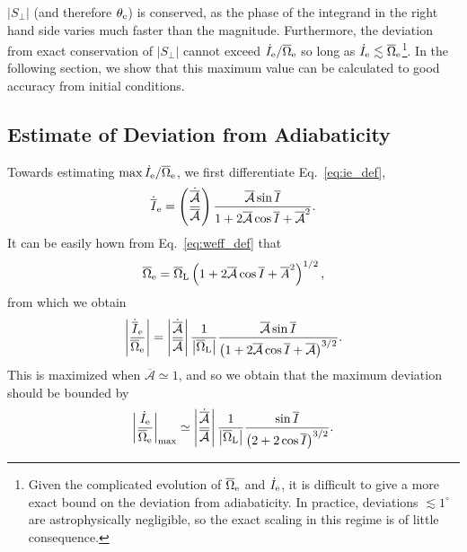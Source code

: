 \documentclass[
        fleqn,
        usenatbib,
    ]{mnras}
\newcommand*{\abs}[1]{\left|#1\right|}
\newcommand*{\p}[1]{\left(#1\right)}
\begin{document}
$\abs{S_\perp}$ (and therefore $\theta_{\rm e}$) is conserved, as the phase of
the integrand in the right hand side varies much faster than the magnitude.
Furthermore, the deviation from exact conservation of $\abs{S_{\perp}}$ cannot
exceed $\dot{I}_{\rm e} / \overline{\Omega}_{\rm
e}$ so long as $\dot{I}_{\rm e} \lesssim \overline{\Omega}_{\rm
e}$\footnote{Given the complicated evolution of $\overline{\Omega}_{\rm e}$ and
$\dot{I}_{\rm e}$, it is difficult to give a more exact bound on the deviation
from adiabaticity. In practice, deviations $\lesssim 1^\circ$ are
astrophysically negligible, so the exact scaling in this regime is of little
consequence.}. In the following section, we show that this maximum value can be
calculated to good accuracy from initial conditions.

\subsection{Estimate of Deviation from Adiabaticity}

Towards estimating $\max \dot{I}_{\rm e} / \overline{\Omega}_{\rm e}$, we first
differentiate Eq.~\eqref{eq:ie_def},
\begin{equation}
    \dot{\overline{I}}_{\rm e} = \p{\frac{\dot{\overline{\mathcal{A}}}}{
            \overline{\mathcal{A}}}}
        \frac{\overline{\mathcal{A}} \sin \overline{I}}{
            1 + 2\overline{\mathcal{A}}\cos \overline{I}
                + \overline{\mathcal{A}}^2}.
\end{equation}
It can be easily hown from Eq.~\eqref{eq:weff_def} that
\begin{equation}
    \overline{\Omega}_{\rm e} = \overline{\Omega}_{\rm L}
        \p{1 + 2\overline{\mathcal{A}}\cos \overline{I}
            + \overline{A}^2}^{1/2},
\end{equation}
from which we obtain
\begin{equation}
    \abs{\frac{\dot{\overline{I}}_{\rm e}}{\overline{\Omega}_{\rm e}}}
        = \abs{\frac{\dot{\overline{\mathcal{A}}}}{
            \overline{\mathcal{A}}}}
        \frac{1}{\abs{\overline{\Omega}_{\rm L}}}
        \frac{\overline{\mathcal{A}} \sin \overline{I}}{
            \p{1 + 2\overline{\mathcal{A}}\cos \overline{I}
                + \overline{\mathcal{A}}}^{3/2}}.
\end{equation}
This is maximized when $\overline{\mathcal{A}} \simeq 1$, and so we obtain that
the maximum deviation should be bounded by
\begin{equation}
    \abs{\frac{\dot{I}_{\rm e}}{\overline{\Omega}_{\rm e}}}_{\max}
        \simeq \abs{\frac{\dot{\overline{\mathcal{A}}}}{\overline{\mathcal{A}}}}
            \frac{1}{\abs{\overline{\Omega}_{\rm L}}}
            \frac{\sin \overline{I}}{\p{2 + 2\cos \overline{I}}^{3/2}}.
            \label{eq:idot_over_W}
\end{equation}
\end{document}

